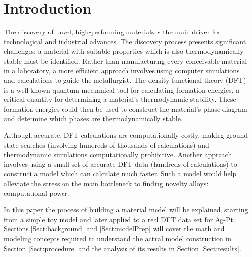 \section{Introduction}\label{Sect:intro}
\par The discovery of novel, high-performing materials is the main driver for technological and industrial advances. The discovery process presents significant challenges; a material with suitable properties which is also thermodynamically stable must be identified. Rather than manufacturing every conceivable material in a laboratory, a more efficient approach involves using computer simulations and calculations to guide the metallurgist.  The density functional theory (DFT) is a well-known quantum-mechanical tool for calculating formation energies, a critical quantity for determining a material's thermodynamic stability.  These formation energies could then be used to construct the material's phase diagram and determine which phases are thermodynamically stable. 
\par Although accurate, DFT calculations are computationally costly, making ground state searches (involving hundreds of thousands of calculations) and thermodynamic simulations computationally prohibitive. Another approach involves using a small set of accurate DFT data (hundreds of calculations) to construct a model which can calculate much faster.  Such a model would help alleviate the stress on the main bottleneck to finding novelty alloys: computational power. 
\par In this paper the process of building a material model will be explained, starting from a simple toy model and later applied to a real DFT data set for Ag-Pt.  Sections \ref{Sect:background} and \ref{Sect:modelPrep} will cover the math and modeling concepts required to understand the actual model construction in Section \ref{Sect:procedure} and the analysis of its results in Section \ref{Sect:results}. 